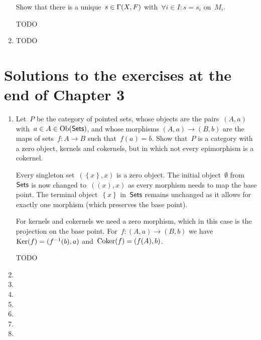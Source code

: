 \documentclass[a4paper,11pt,oneside,openany,article]{memoir}
\begin{document}
\begin{enumerate}
    Show that there is a unique~$s\in\mathrm{\Gamma}(X,F)$ with~$\forall i\in I\colon s=s_i$ on~$M_i$.

    \begin{solution}
      TODO
    \end{solution}

  \item TODO
\end{enumerate}

\clearpage

\chapter{Solutions to the exercises at the end of Chapter 3}
\begin{enumerate}
  \item Let~$P$ be the category of pointed sets, whose objects are the pairs~$(A,a)$ with~$a\in A\in\operatorname{Ob}(\textsf{Sets})$, and whose morphisms $(A,a)\to(B,b)$ are the maps of sets~$f\colon A\to B$ such that~$f(a)=b$. Show that~$P$ is a category with a zero object, kernels and cokernels, but in which not every epimorphism is a cokernel.

    \begin{solution}
      Every singleton set~$(\left\{ x \right\},x)$ is a zero object. The initial object~$\emptyset$ from~$\textsf{Sets}$ is now changed to~$(\left( x \right),x)$ as every morphism needs to map the base point. The terminal object~$\left\{ x \right\}$ in~$\textsf{Sets}$ remains unchanged as it allows for exactly one morphism (which preserves the base point).

      For kernels and cokernels we need a zero morphism, which in this case is the projection on the base point. For~$f\colon(A,a)\to(B,b)$ we have~$\operatorname{Ker}(f)=(f^{-1}(b),a)$ and~$\operatorname{Coker}(f)=(f(A),b)$.

      TODO
    \end{solution}

  \item 

  \item 

  \item 

  \item 

  \item 

  \item 

  \item 


\end{enumerate}
\end{document}
